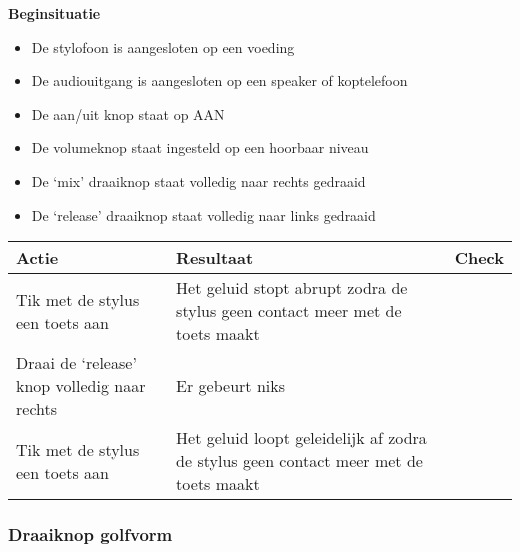 \documentclass[12pt, a4paper, dutch]{article}
\newcommand{\cb}{\Square}
\newcommand{\stroom}{De stylofoon is aangesloten op een voeding}
\newcommand{\audio}{De audiouitgang is aangesloten op een speaker of koptelefoon}
\newcommand{\aan}{De aan/uit knop staat op AAN}
\newcommand{\vol}{De volumeknop staat ingesteld op een hoorbaar niveau}
\begin{document}
\begin{minipage}{\textwidth}
\textbf{Beginsituatie}
\begin{itemize}
	\item \stroom
	\item \audio
	\item \aan
	\item \vol
	\item De `mix' draaiknop staat volledig naar rechts gedraaid
	\item De `release' draaiknop staat volledig naar links gedraaid
\end{itemize}

\medskip

\begin{tabularx}{\textwidth}{p{}p{}>{\raggedleft\arraybackslash}X}
\toprule
\textbf{Actie} & \textbf{Resultaat} & \textbf{Check}\\
\midrule
Tik met de stylus een toets aan &
Het geluid stopt abrupt zodra de stylus geen contact meer met de toets maakt &
\cb\\

Draai de `release' knop volledig naar rechts &
Er gebeurt niks &
\cb\\

Tik met de stylus een toets aan &
Het geluid loopt geleidelijk af zodra de stylus geen contact meer met de toets
maakt &
\cb\\
\bottomrule
\end{tabularx}
\end{minipage}

\subsubsection{Draaiknop golfvorm}
\end{document}
